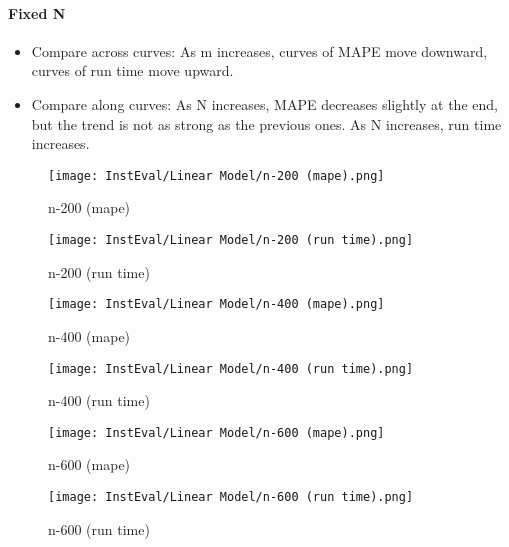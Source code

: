 \documentclass[12pt]{article}
\begin{document}
\paragraph{Fixed N}
\begin{itemize}
\item Compare across curves: As m increases, curves of MAPE move downward, curves of run time move upward.
\item Compare along curves: As N increases, MAPE decreases slightly at the end, but the trend is not as strong as the previous ones. As N increases, run time increases. 
\end{itemize}

\begin{figure}[H]
\centering
    \begin{minipage}{0.45\textwidth}
        \centering
        \texttt{[image: InstEval/Linear Model/n-200 (mape).png]}
        \caption{n-200 (mape)}
        \label{fig:figure1}
    \end{minipage}\hfill
    \begin{minipage}{0.45\textwidth}
        \centering
        \texttt{[image: InstEval/Linear Model/n-200 (run time).png]}
        \caption{n-200 (run time)}
    \end{minipage}
\end{figure}

\begin{figure}[H]
\centering
    \begin{minipage}{0.45\textwidth}
        \centering
        \texttt{[image: InstEval/Linear Model/n-400 (mape).png]}
        \caption{n-400 (mape)}
        \label{fig:figure1}
    \end{minipage}\hfill
    \begin{minipage}{0.45\textwidth}
        \centering
        \texttt{[image: InstEval/Linear Model/n-400 (run time).png]}
        \caption{n-400 (run time)}
    \end{minipage}
\end{figure}

\begin{figure}[H]
\centering
    \begin{minipage}{0.45\textwidth}
        \centering
        \texttt{[image: InstEval/Linear Model/n-600 (mape).png]}
        \caption{n-600 (mape)}
        \label{fig:figure1}
    \end{minipage}\hfill
    \begin{minipage}{0.45\textwidth}
        \centering
        \texttt{[image: InstEval/Linear Model/n-600 (run time).png]}
        \caption{n-600 (run time)}
    \end{minipage}
\end{figure}
\end{document}
